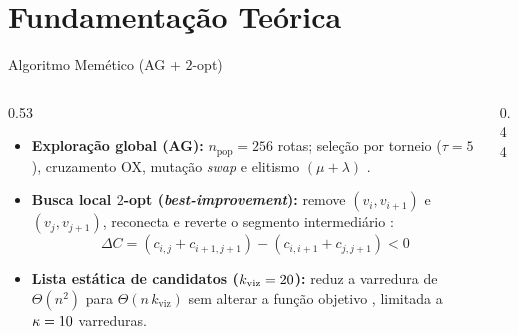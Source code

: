 
\section{Fundamentação Teórica}

\begin{frame}{Algoritmo Memético (AG + $2$-opt)}
  \begin{columns}[c,onlytextwidth]
    \begin{column}{0.53\textwidth}
      \begin{itemize}
        \small
        \item \textbf{Exploração global (AG):} $n_{\text{pop}} = 256$ rotas; seleção por torneio ($\tau = 5$), cruzamento OX, mutação \emph{swap} e elitismo $(\mu + \lambda)$ \autocite{goldberg1989genetic,larranaga1999genetic}.
        \item \textbf{Busca local $2$-opt (\emph{best-improvement}):} remove $(v_i,v_{i+1})$ e $(v_j,v_{j+1})$, reconecta e reverte o segmento intermediário \autocite{croes1958method}:
              \[
                \Delta C = (c_{i,j} + c_{i+1,j+1}) - (c_{i,i+1} + c_{j,j+1}) < 0
              \]
        \item \textbf{Lista estática de candidatos ($k_{\text{viz}} = 20$):} reduz a varredura de $\Theta(n^2)$ para $\Theta(n\,k_{\text{viz}})$ sem alterar a função objetivo \autocite{lin1973efficient}, limitada a $\kappa = 10$ varreduras.
      \end{itemize}
    \end{column}
    \begin{column}{0.44\textwidth}
\end{column}
\end{columns}
\end{frame}
